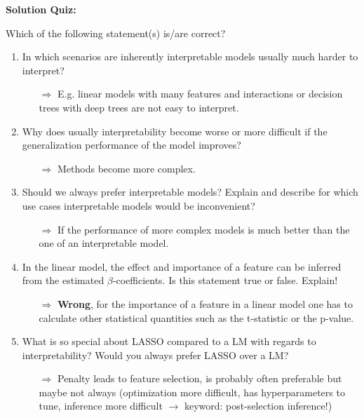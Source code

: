 \textbf{Solution Quiz:}\\\noindent
\medskip

Which of the following statement(s) is/are correct?  
	\begin{enumerate}
        \item In which scenarios are inherently interpretable models usually much harder to interpret?
    	\begin{itemize}
    		\item[$\Rightarrow$] E.g. linear models with many features and interactions or decision trees with deep trees are not easy to interpret.
    	\end{itemize}
    	\item Why does usually interpretability become worse or more difficult if the generalization performance of the model improves?
    	\begin{itemize}
    		\item[$\Rightarrow$] Methods become more complex.
    	\end{itemize}
    	\item Should we always prefer interpretable models? Explain and describe for which use cases interpretable models would be inconvenient?
    	\begin{itemize}
    		\item[$\Rightarrow$] If the performance of more complex models is much better than the one of an interpretable model.
    	\end{itemize}
    	\item In the linear model, the effect and importance of a feature can be inferred from the estimated $\beta$-coefficients. Is this statement true or false. Explain!
    	\begin{itemize}
    		\item[$\Rightarrow$] \textbf{Wrong}, for the importance of a feature in a linear model one has to calculate other statistical quantities such as the t-statistic or the p-value.
    	\end{itemize}
    	\item What is so special about LASSO compared to a LM with regards to interpretability? Would you always prefer LASSO over a LM?
    	\begin{itemize}
    		\item[$\Rightarrow$] Penalty leads to feature selection, is probably often preferable but maybe not always (optimization more difficult, has hyperparameters to tune, inference more difficult $\rightarrow$ keyword: post-selection inference!)

\end{itemize}
\end{enumerate}
